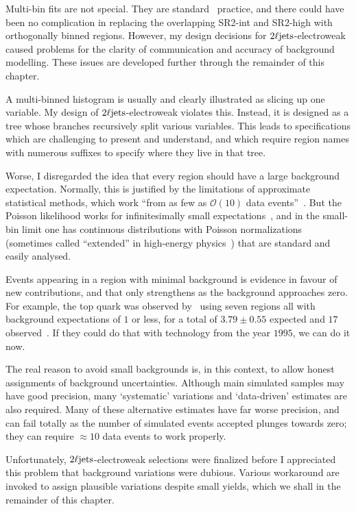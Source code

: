 Multi-bin fits are not special.
They are standard \atlas\ practice, and there could have been no complication
in replacing the overlapping SR2-int and SR2-high with orthogonally binned
regions.
However, my design decisions for $2\ell\mathrm{jets}$-electroweak
caused problems for the clarity of communication and accuracy of background
modelling.
These issues are developed further through the remainder of this chapter.

A multi-binned histogram is usually and clearly illustrated as slicing up one
variable.
My design of $2\ell\mathrm{jets}$-electroweak violates this.
Instead, it is designed as a tree whose branches recursively split various
variables.
This leads to specifications which are challenging to present and understand,
and which require region names with numerous suffixes to specify where they
live in that tree.

Worse, I disregarded the idea that every region should have a large
background expectation.
Normally, this is justified by the limitations of approximate statistical
methods, which work
``from as few as $\mathcal{O}(10)$ data events''~\cite{histfitter2014}.
But the Poisson likelihood works for infinitesimally small
expectations~\cite{skilling2009cosmology}, and in the small-bin limit one has
continuous distributions with Poisson normalizations
(sometimes called ``extended'' in high-energy
physics~\cite{barlow1990extended})
that are standard and easily analysed.

Events appearing in a region with minimal background is evidence in favour
of new contributions, and that only strengthens as the background approaches
zero.
For example, the top quark was observed by \dzero\ using seven regions all with
background expectations of $1$ or less, for a total of $3.79\pm0.55$ expected
and $17$ observed~\cite{abachi1995observation}.
If they could do that with technology from the year $1995$, we can do it now.

The real reason to avoid small backgrounds is, in this context, to allow honest
assignments of background uncertainties.
Although main simulated samples may have good precision,
many `systematic' variations and `data-driven' estimates are also required.
Many of these alternative estimates have far worse precision, and can fail
totally as the number of simulated events accepted plunges towards zero;
they can require $\approx10$ data events to work properly.

Unfortunately, $2\ell\mathrm{jets}$-electroweak selections were finalized before I
appreciated this problem that background variations were dubious.
Various workaround are invoked to assign plausible variations despite small
yields, which we shall in the remainder of this chapter.

